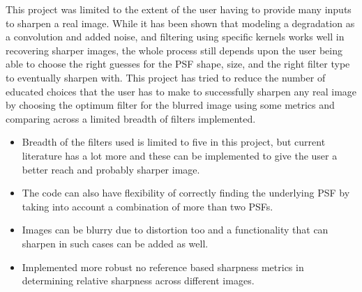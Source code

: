 \noindent This project was limited to the extent of the user having to provide many inputs to sharpen a real image. 
While it has been shown that modeling a degradation as a convolution and added noise, and filtering using specific kernels works well in recovering sharper images, the whole process still depends upon the user being able to choose the right guesses for the PSF shape, size, and the right filter type to eventually sharpen with. This project has tried to reduce the number of educated choices that the user has to make to successfully sharpen any real image by choosing the optimum filter for the blurred image using some metrics and comparing across a limited breadth of filters implemented.
\begin{itemize}
\item Breadth of the filters used is limited to five in this project, but current literature has a lot more and these can be implemented to give the user a better reach and probably sharper image.
\item The code can also have flexibility of correctly finding the underlying PSF by taking into account a combination of more than two PSFs. 
\item Images can be blurry due to distortion too and a functionality that can sharpen in such cases can be added as well.
\item Implemented more robust no reference based sharpness metrics in determining relative sharpness across different images.
\end{itemize}




\newpage